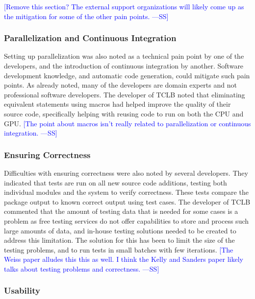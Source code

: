 \documentclass[final, 3p, times, authoryear]{elsarticle}
\newcommand{\authornote}[3]{\textcolor{#1}{[#3 ---#2]}}
\newcommand{\authornote}[3]{}
\newcommand{\wss}[1]{\authornote{blue}{SS}{#1}} %
\begin{document}
\wss{Remove this section?  The external support organizations will likely come
up as the mitigation for some of the other pain points.}

\subsubsection{Parallelization and Continuous Integration}

Setting up parallelization was also noted as a technical pain point by one of
the developers, and the introduction of continuous integration by another.
Software development knowledge, and automatic code generation, could mitigate
such pain points. As already noted, many of the developers are domain experts
and not professional software developers. The developer of TCLB noted that
eliminating equivalent statements using macros had helped improve the quality of
their source code, specifically helping with reusing code to run on both the CPU
and GPU. \wss{The point about macros isn't really related to parallelization or
continuous integration.}

\subsubsection{Ensuring Correctness}

Difficulties with ensuring correctness were also noted by several developers.
They indicated that tests are run on all new source code additions, testing both
individual modules and the system to verify correctness. These tests compare the
package output to known correct output using test cases. The developer of TCLB
commented that the amount of testing data that is needed for some cases is a
problem as free testing services do not offer capabilities to store and process
such large amounts of data, and in-house testing solutions needed to be created
to address this limitation. The solution for this has been to limit the size of
the testing problems, and to run tests in small batches with few iterations.
\wss{The Weiss paper alludes this this as well.  I think the Kelly and Sanders
paper likely talks about testing problems and correctness.}

\subsubsection{Usability}
\end{document}
